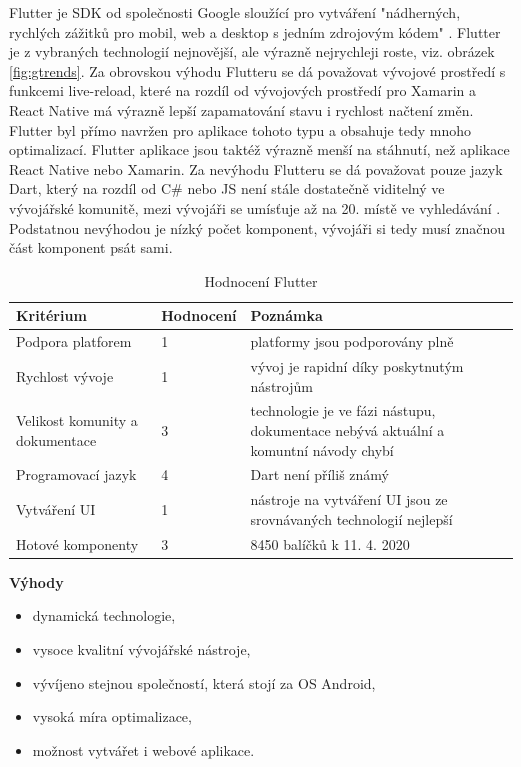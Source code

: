 Flutter je SDK od společnosti Google sloužící pro vytváření "nádherných, rychlých zážitků pro mobil, web a desktop s jedním zdrojovým kódem" \cite{flutter}. Flutter je z vybraných technologií nejnovější, ale výrazně nejrychleji roste, viz. obrázek \ref{fig:gtrends}. Za obrovskou výhodu Flutteru se dá považovat vývojové prostředí s funkcemi live-reload, které na rozdíl od vývojových prostředí pro Xamarin a React Native má výrazně lepší zapamatování stavu i rychlost načtení změn. Flutter byl přímo navržen pro aplikace tohoto typu a obsahuje tedy mnoho optimalizací. Flutter aplikace jsou taktéž výrazně menší na stáhnutí, než aplikace React Native nebo Xamarin. Za nevýhodu Flutteru se dá považovat pouze jazyk Dart, který na rozdíl od C\# nebo JS není stále dostatečně viditelný ve vývojářské komunitě, mezi vývojáři se umísťuje až na 20. místě ve vyhledávání \cite{novick2017react}. Podstatnou nevýhodou je nízký počet komponent, vývojáři si tedy musí značnou část komponent psát sami.

\begin{table}[h]
	\begin{tabularx}{\textwidth}{| X | X | X |}
		\hline
		Kritérium                       & Hodnocení & Poznámka \\
		\hline
		Podpora platforem               & 1 & platformy jsou podporovány plně          \\
		\hline
		Rychlost vývoje                 & 1 & vývoj je rapidní díky poskytnutým nástrojům         \\
		\hline
		Velikost komunity a dokumentace & 3 & technologie je ve fázi nástupu, dokumentace nebývá aktuální a komuntní návody chybí         \\
		\hline
		Programovací jazyk              & 4 & Dart není příliš známý \\
		\hline
		Vytváření UI                    & 1 & nástroje na vytváření UI jsou ze srovnávaných technologií nejlepší \\
		\hline
		Hotové komponenty               & 3 & 8450 balíčků k 11. 4. 2020 \\
		\hline    
	\end{tabularx}
	\caption{Hodnocení Flutter}
\end{table}

\textbf{Výhody}
\begin{itemize}
	\item dynamická technologie,
	\item vysoce kvalitní vývojářské nástroje,
	\item vývíjeno stejnou společností, která stojí za OS Android,
	\item vysoká míra optimalizace,
	\item možnost vytvářet i webové aplikace.
\end{itemize}

